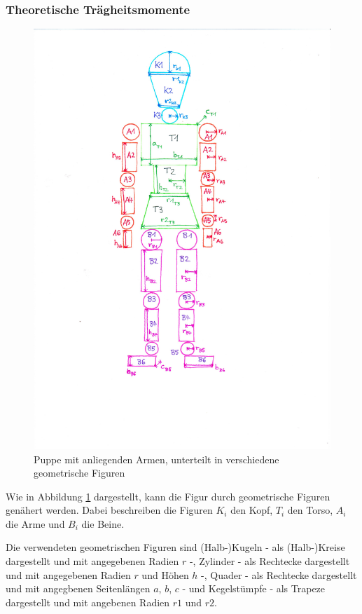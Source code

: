   \subsubsection{Theoretische Trägheitsmomente}

  \begin{figure}
    \centering
    \includegraphics[scale=0.8]{content/Igor.pdf}
    \caption{Puppe mit anliegenden Armen, unterteilt in verschiedene
    geometrische Figuren}
    \label{fig:Igor}
  \end{figure}

  Wie in Abbildung \ref{fig:Igor} dargestellt, kann die Figur durch geometrische Figuren
  genähert werden. Dabei beschreiben die Figuren $K_i$ den Kopf, $T_i$ den Torso, 
  $A_i$ die Arme und $B_i$ die Beine.
  
  Die verwendeten geometrischen Figuren sind 
  (Halb-)Kugeln - als (Halb-)Kreise dargestellt und mit angegebenen Radien $r$ -, 
  Zylinder - als Rechtecke dargestellt und mit angegebenen Radien $r$ und Höhen $h$ -, 
  Quader - als Rechtecke dargestellt und mit angegbenen Seitenlängen $a$, $b$, $c$ -
  und Kegelstümpfe - als Trapeze dargestellt und mit angebenen Radien $r1$ und $r2$.

